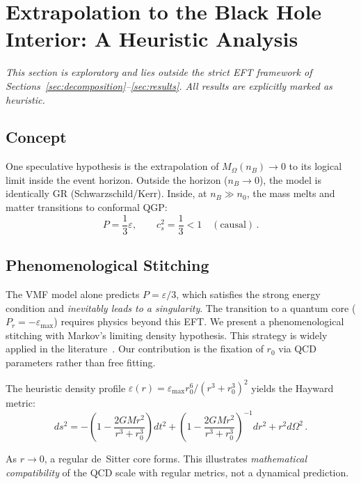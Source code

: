\documentclass[11pt,a4paper]{article}
\begin{document}
\section{Extrapolation to the Black Hole Interior: A Heuristic Analysis}
\label{sec:bh}

\emph{This section is exploratory and lies outside the strict EFT framework of Sections~\ref{sec:decomposition}--\ref{sec:results}. All results are explicitly marked as heuristic.}

\subsection{Concept}

One speculative hypothesis is the extrapolation of $M_\Omega(n_B) \to 0$ to its logical limit inside the event horizon. Outside the horizon ($n_B \to 0$), the model is identically GR (Schwarzschild/Kerr). Inside, at $n_B \gg n_0$, the mass melts and matter transitions to conformal QGP:
\begin{equation}
P = \frac{1}{3}\varepsilon, \qquad c_s^2 = \frac{1}{3} < 1 \quad (\text{causal})\,.
\end{equation}

\subsection{Phenomenological Stitching}

The VMF model alone predicts $P = \varepsilon/3$, which satisfies the strong energy condition and \emph{inevitably leads to a singularity}. The transition to a quantum core ($P_r = -\varepsilon_{\max}$) requires physics beyond this EFT. We present a phenomenological stitching with Markov's limiting density hypothesis. This strategy is widely applied in the literature~\cite{Bardeen1968,Dymnikova1992,Hayward2006,Simpson2019}. Our contribution is the fixation of $r_0$ via QCD parameters rather than free fitting.

The heuristic density profile $\varepsilon(r) = \varepsilon_{\max} r_0^6 / (r^3 + r_0^3)^2$ yields the Hayward metric:
\begin{equation}
ds^2 = -\!\left(1 - \frac{2GM r^2}{r^3 + r_0^3}\right) dt^2 + \left(1 - \frac{2GM r^2}{r^3 + r_0^3}\right)^{-1}\! dr^2 + r^2 d\Omega^2\,.
\label{eq:hayward}
\end{equation}

As $r \to 0$, a regular de~Sitter core forms. This illustrates \emph{mathematical compatibility} of the QCD scale with regular metrics, not a dynamical prediction.
\end{document}
